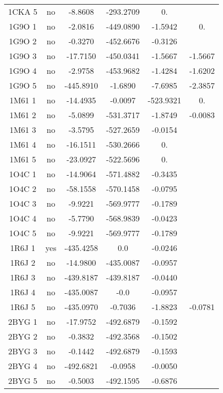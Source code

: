 \begin{table}[h]
{\begin{tabular}{cccccc}
        1CKA 5 & no & -8.8608    &    -293.2709 & 0.      & \\                    
        1G9O 1 & no & -2.0816    &    -449.0890 & -1.5942 & 0. \\               
        1G9O 2 & no & -0.3270    &    -452.6676 & -0.3126 & \\          
        1G9O 3 & no & -17.7150   &    -450.0341 & -1.5667 & -1.5667 \\         
        1G9O 4 & no & -2.9758    &    -453.9682 & -1.4284 & -1.6202 \\          
        1G9O 5 & no & -445.8910  &    -1.6890   & -7.6985   & -2.3857 \\          
        1M61 1 & no & -14.4935   &    -0.0097   & -523.9321 & 0. \\            
        1M61 2 & no & -5.0899    &    -531.3717 & -1.8749 & -0.0083 \\         
        1M61 3 & no & -3.5795    &    -527.2659 & -0.0154 & \\           
        1M61 4 & no & -16.1511   &    -530.2666 & 0. & \\              
        1M61 5 & no & -23.0927   &    -522.5696 & 0. & \\                 
        1O4C 1 & no & -14.9064   &    -571.4882 & -0.3435 & \\         
        1O4C 2 & no & -58.1558   &    -570.1458 & -0.0795 & \\         
        1O4C 3 & no & -9.9221    &    -569.9777 & -0.1789 & \\          
        1O4C 4 & no & -5.7790    &    -568.9839 & -0.0423 & \\          
        1O4C 5 & no & -9.9221    &    -569.9777 & -0.1789 & \\          
        1R6J 1 & yes& -435.4258  &     0.0      & -0.0246 & \\               
        1R6J 2 & no & -14.9800   &    -435.0087 & -0.0957 & \\         
        1R6J 3 & no & -439.8187  &    -439.8187 & -0.0440 & \\               
        1R6J 4 & no &  -435.0087  &    -0.0     & -0.0957 & \\               
        1R6J 5 & no & -435.0970  &    -0.7036   & -1.8823 & -0.0781 \\          
        2BYG 1 & no & -17.9752   &    -492.6879 & -0.1592 & \\         
        2BYG 2 & no & -0.3832    &    -492.3568 & -0.1502 & \\          
        2BYG 3 & no & -0.1442    &    -492.6879 & -0.1593 & \\          
        2BYG 4 & no & -492.6821 &    -0.0958    & -0.0050 & \\          
        2BYG 5 & no & -0.5003    &   -492.1595  & -0.6876 & \\           
       \bottomrule


 \end{tabular}  
}    
\label{tab:result_30_actives}      
\end{table}
 
